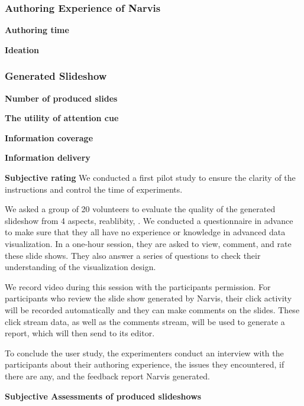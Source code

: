 \subsubsection{Authoring Experience of Narvis}

\noindent
\textbf{Authoring time}

\noindent
\textbf{Ideation}

\subsubsection{Generated Slideshow}

\noindent
\textbf{Number of produced slides}

\noindent
\textbf{The utility of attention cue}

\noindent
\textbf{Information coverage}

\noindent
\textbf{Information delivery}

\noindent
\textbf{Subjective rating}
We conducted a first pilot study to ensure the clarity of the instructions and control the time of experiments. 

We asked a group of 20 volunteers to evaluate the quality of the generated slideshow from 4 aspects, reablibity, . We conducted a questionnaire in advance to make sure that they all have no experience or knowledge in advanced data visualization. In a one-hour session, they are asked to view, comment, and rate these slide shows. They also answer a series of questions to check their understanding of the visualization design. \par 
We record video during this session with the participants permission. For participants who review the slide show generated by Narvis, their click activity will be recorded automatically and they can make comments on the slides. These click stream data, as well as the comments stream, will be used to generate a report, which will then send to its editor. \par
To conclude the user study, the experimenters conduct an interview with the participants about their authoring experience, the issues they encountered, if there are any, and the feedback report Narvis generated. \par
\noindent{}
\textbf{Subjective Assessments of produced slideshows}

